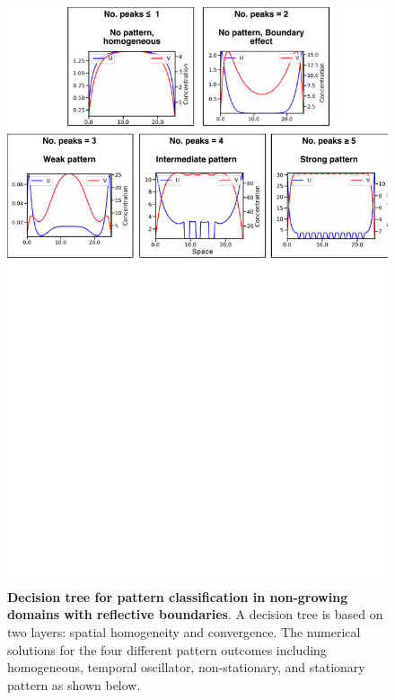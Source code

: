 \begin{figure}[!h]
    \includegraphics[width=1\textwidth]{figures/growth_classification}

    \caption{\textbf{Decision tree for pattern classification in non-growing domains with reflective boundaries}. A decision tree is based on two layers: spatial homogeneity and convergence. The numerical solutions for the four different pattern outcomes including  homogeneous, temporal oscillator, non-stationary, and stationary pattern as shown below.}
    \label{sup_fig3}
\end{figure}


